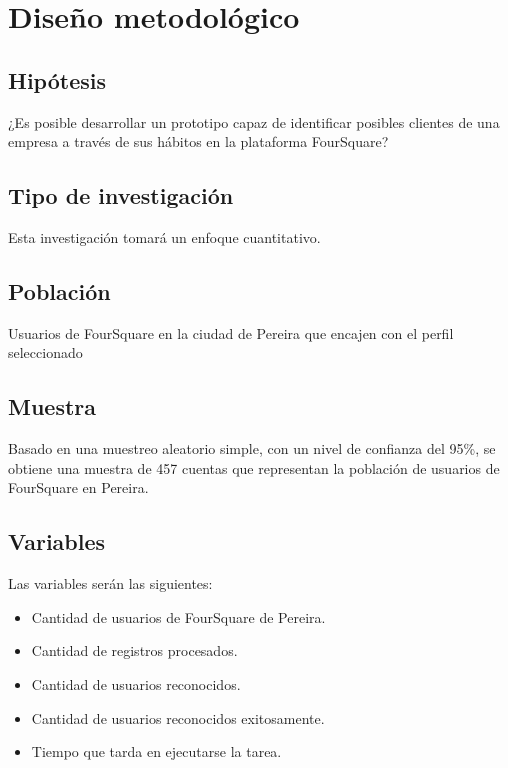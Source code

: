 \chapter{Dise\~no metodol\'ogico}
\label{sec:diseno}
\section{Hip\'otesis}
¿Es posible desarrollar un prototipo capaz de identificar posibles clientes de una empresa a trav\'es de sus h\'abitos en la plataforma FourSquare?
\section{Tipo de investigaci\'on}
Esta investigaci\'on tomar\'a un enfoque cuantitativo.
\section{Poblaci\'on}
Usuarios de FourSquare en la ciudad de Pereira que encajen con el perfil seleccionado
\section{Muestra}
Basado en una muestreo aleatorio simple, con un nivel de confianza del 95\%, se obtiene una muestra de 457 cuentas que representan la poblaci\'on de usuarios de FourSquare en Pereira.
\section{Variables}
Las variables ser\'an las siguientes:
\begin{itemize}
\item Cantidad de usuarios de FourSquare de Pereira.
\item Cantidad de registros procesados.
\item Cantidad de usuarios reconocidos.
\item Cantidad de usuarios reconocidos exitosamente.
\item Tiempo que tarda en ejecutarse la tarea.
\end{itemize}
